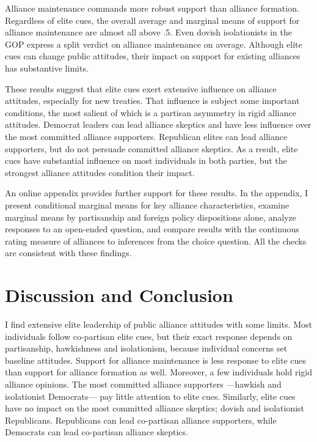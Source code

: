 \documentclass[12pt]{article}
\begin{document}
Alliance maintenance commands more robust support than alliance formation. 
Regardless of elite cues, the overall average and marginal means of support for alliance maintenance are almost all above .5. 
Even dovish isolationists in the GOP express a split verdict on alliance maintenance on average.
Although elite cues can change public attitudes, their impact on support for existing alliances has substantive limits.


These results suggest that elite cues exert extensive influence on alliance attitudes, especially for new treaties.
That influence is subject some important conditions, the most salient of which is a partisan asymmetry in rigid alliance attitudes. 
Democrat leaders can lead alliance skeptics and have less influence over the most committed alliance supporters. 
Republican elites can lead alliance supporters, but do not persuade committed alliance skeptics. 
As a result, elite cues have substantial influence on most individuals in both parties, but the strongest alliance attitudes condition their impact. 


An online appendix provides further support for these results. 
In the appendix, I present conditional marginal means for key alliance characteristics, examine marginal means by partisanship and foreign policy dispositions alone, analyze responses to an open-ended question, and compare results with the continuous rating measure of alliances to inferences from the choice question.
All the checks are consistent with these findings. 


\section{Discussion and Conclusion} 


I find extensive elite leadership of public alliance attitudes with some limits.  
Most individuals follow co-partisan elite cues, but their exact response depends on partisanship, hawkishness and isolationism, because individual concerns set baseline attitudes.
Support for alliance maintenance is less response to elite cues than support for alliance formation as well. 
Moreover, a few individuals hold rigid alliance opinions.  
The most committed alliance supporters ---hawkish and isolationist Democrats--- pay little attention to elite cues.
Similarly, elite cues have no impact on the most committed alliance skeptics; dovish and isolationist Republicans. 
Republicans can lead co-partisan alliance supporters, while Democrats can lead co-partisan alliance skeptics. 
\end{document}
